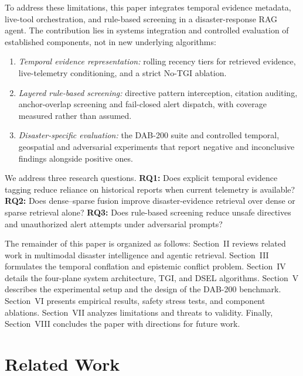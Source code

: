\documentclass[conference]{IEEEtran}
\begin{document}
To address these limitations, this paper integrates temporal evidence metadata, live-tool orchestration, and rule-based screening in a disaster-response RAG agent. The contribution lies in systems integration and controlled evaluation of established components, not in new underlying algorithms:
\begin{enumerate}
    \item \textit{Temporal evidence representation:} rolling recency tiers for retrieved evidence, live-telemetry conditioning, and a strict No-TGI ablation.
    \item \textit{Layered rule-based screening:} directive pattern interception, citation auditing, anchor-overlap screening and fail-closed alert dispatch, with coverage measured rather than assumed.
    \item \textit{Disaster-specific evaluation:} the DAB-200 suite \cite{dab200} and controlled temporal, geospatial and adversarial experiments that report negative and inconclusive findings alongside positive ones.
\end{enumerate}
We address three research questions. \textbf{RQ1:} Does explicit temporal evidence tagging reduce reliance on historical reports when current telemetry is available? \textbf{RQ2:} Does dense--sparse fusion improve disaster-evidence retrieval over dense or sparse retrieval alone? \textbf{RQ3:} Does rule-based screening reduce unsafe directives and unauthorized alert attempts under adversarial prompts?

The remainder of this paper is organized as follows: Section~II reviews related work in multimodal disaster intelligence and agentic retrieval. Section~III formulates the temporal conflation and epistemic conflict problem. Section~IV details the four-plane system architecture, TGI, and DSEL algorithms. Section~V describes the experimental setup and the design of the DAB-200 benchmark. Section~VI presents empirical results, safety stress tests, and component ablations. Section~VII analyzes limitations and threats to validity. Finally, Section~VIII concludes the paper with directions for future work.

\section{Related Work}
\end{document}
